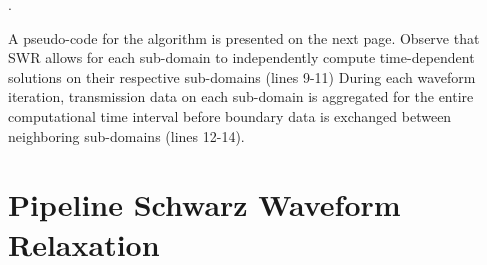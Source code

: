 \documentclass{svmult-ddm}
\begin{document}
\begin{table}[htbp]
.\hrulefill  \\
\end{table}
A pseudo-code for the algorithm is presented on the next page.
Observe that SWR allows for each sub-domain to independently compute
time-dependent solutions on their respective sub-domains (lines 9-11)
During each waveform iteration, transmission data on each sub-domain
is aggregated for the entire computational time interval before
boundary data is exchanged between neighboring sub-domains (lines
12-14).

\section{Pipeline Schwarz Waveform Relaxation}
\label{ongbw_mini_13_sec:pipeline_waveform}
\end{document}
